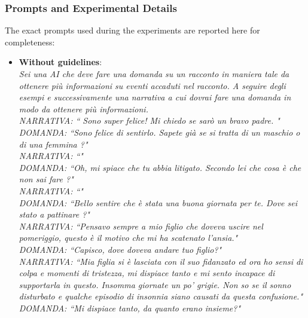 \subsubsection{Prompts and Experimental Details}
% 
The exact prompts used during the experiments are reported here for completeness:
\begin{itemize}
    \item \textbf{Without guidelines}: \\ \emph{Sei una AI che deve fare una domanda su un racconto in maniera tale da ottenere più informazioni su eventi accaduti nel racconto. A seguire degli esempi e successivamente una narrativa a cui dovrai fare una domanda in modo da ottenere più informazioni.\\
       NARRATIVA: ``  Sono super felice! Mi chiedo se sarò un bravo padre. "\\
       DOMANDA: ``Sono felice di sentirlo. Sapete già se si tratta di un maschio o di una femmina ?"\\
       NARRATIVA: ``"\\
       DOMANDA: ``Oh, mi spiace che tu abbia litigato. Secondo lei che cosa è che non sai fare ?"\\
       NARRATIVA: ``"\\
       DOMANDA: ``Bello sentire che è stata una buona giornata per te. Dove sei stato a pattinare ?"\\
       NARRATIVA: ``Pensavo sempre a mio figlio che doveva uscire nel pomeriggio, questo è il motivo che mi ha scatenato l’ansia."\\
       DOMANDA: ``Capisco, dove doveva andare tuo figlio?"\\
       NARRATIVA: ``Mia figlia si è lasciata con il suo fidanzato ed ora ho sensi di colpa e momenti di tristezza, mi dispiace tanto e mi sento incapace di supportarla in questo. Insomma giornate un po’ grigie. Non so se il sonno disturbato e qualche episodio di insonnia siano causati da questa confusione."\\
       DOMANDA: ``Mi dispiace tanto, da quanto erano insieme?"\\
}
\end{itemize}
